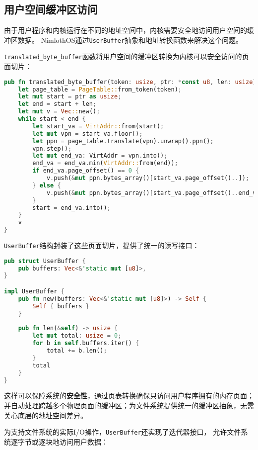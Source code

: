 \subsection{用户空间缓冲区访问}

由于用户程序和内核运行在不同的地址空间中，内核需要安全地访问用户空间的缓冲区数据。
NimlothOS通过\texttt{UserBuffer}抽象和地址转换函数来解决这个问题。

\texttt{translated\_byte\_buffer}函数将用户空间的缓冲区转换为内核可以安全访问的页面切片：

\begin{lstlisting}[language=Rust,caption={用户空间缓冲区转换}, label={lst:translated-buffer}]
pub fn translated_byte_buffer(token: usize, ptr: *const u8, len: usize) -> Vec<&'static mut [u8]> {
    let page_table = PageTable::from_token(token);
    let mut start = ptr as usize;
    let end = start + len;
    let mut v = Vec::new();
    while start < end {
        let start_va = VirtAddr::from(start);
        let mut vpn = start_va.floor();
        let ppn = page_table.translate(vpn).unwrap().ppn();
        vpn.step();
        let mut end_va: VirtAddr = vpn.into();
        end_va = end_va.min(VirtAddr::from(end));
        if end_va.page_offset() == 0 {
            v.push(&mut ppn.bytes_array()[start_va.page_offset()..]);
        } else {
            v.push(&mut ppn.bytes_array()[start_va.page_offset()..end_va.page_offset()]);
        }
        start = end_va.into();
    }
    v
}
\end{lstlisting}

\texttt{UserBuffer}结构封装了这些页面切片，提供了统一的读写接口：

\begin{lstlisting}[language=Rust,caption={UserBuffer结构}, label={lst:user-buffer}]
pub struct UserBuffer {
    pub buffers: Vec<&'static mut [u8]>,
}

impl UserBuffer {
    pub fn new(buffers: Vec<&'static mut [u8]>) -> Self {
        Self { buffers }
    }
    
    pub fn len(&self) -> usize {
        let mut total: usize = 0;
        for b in self.buffers.iter() {
            total += b.len();
        }
        total
    }
}
\end{lstlisting}

这样可以保障系统的\textbf{安全性}，通过页表转换确保只访问用户程序拥有的内存页面；
并自动处理跨越多个物理页面的缓冲区；为文件系统提供统一的缓冲区抽象，无需关心底层的地址空间差异。

为支持文件系统的实际I/O操作，\texttt{UserBuffer}还实现了迭代器接口，
允许文件系统逐字节或逐块地访问用户数据：

